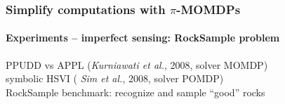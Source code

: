 \documentclass[12pt,svgnames,table]{beamer}
\begin{document}
\begin{frame}
\frametitle{Simplify computations with $\pi$-MOMDPs}
\framesubtitle{\footnotesize Experiments -- imperfect sensing: RockSample problem}

\vspace{-0.2cm} 
	\begin{exampleblock}{}
	PPUDD vs APPL {\footnotesize (\textit{Kurniawati et al.}, 2008, solver MOMDP)} \\
 	\hspace{1cm} symbolic HSVI {\footnotesize ( \textit{Sim et al.}, 2008, solver POMDP)} \\
	{ \color{red!70} RockSample benchmark}: recognize and sample ``good'' rocks
	\end{exampleblock}
\end{frame}
\end{document}

